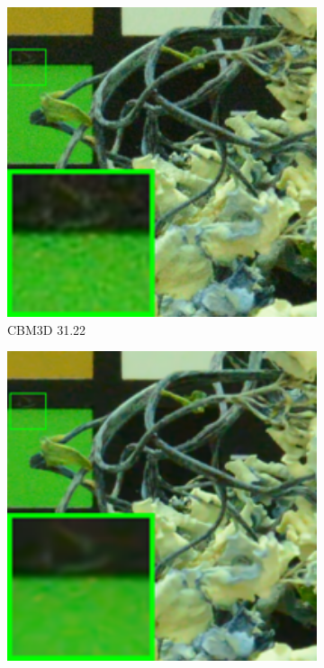 \begin{figure}
\begin{subfigure}[t]{0.19\textwidth}
        \includegraphics[width=1\textwidth]{images/mcwnnm/cc/resize_br_CBM3D_CC15_d800_iso6400_2.png}
		\caption{CBM3D 31.22}
    \end{subfigure}
    \hfill
    \begin{subfigure}[t]{0.19\textwidth}
        \centering
        \includegraphics[width=1\textwidth]{images/mcwnnm/cc/resize_br_TRD_CC15_d800_iso6400_2.png}

\end{subfigure}
\end{figure}
